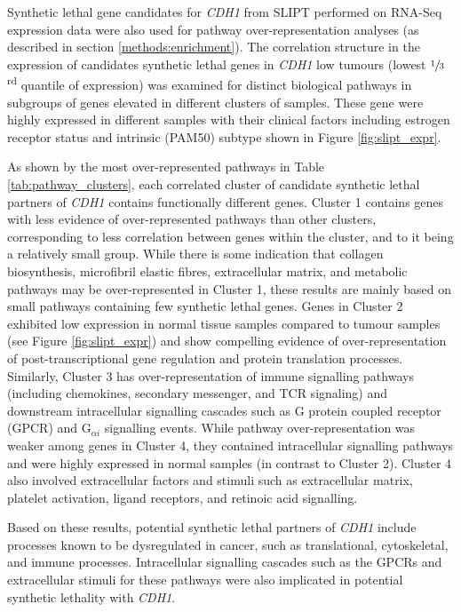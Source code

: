 Synthetic lethal gene candidates for \textit{CDH1} from SLIPT performed on RNA-Seq expression data were also used for pathway over-representation analyses (as described in section \ref{methods:enrichment}). The correlation structure in the expression of candidates synthetic lethal genes in \textit{CDH1} low tumours (lowest $\sfrac{1}{3}$\textsuperscript{rd} quantile of expression) was examined for distinct biological pathways in subgroups of genes elevated in different clusters of samples. These gene were highly expressed in different samples with their clinical factors including estrogen receptor status and intrinsic (PAM50) subtype \citep{Parker2009} shown in Figure \ref{fig:slipt_expr}.

As shown by the most over-represented pathways in Table \ref{tab:pathway_clusters}, each correlated cluster of candidate synthetic lethal partners of \textit{CDH1} contains functionally different genes. %
Cluster 1 contains genes with less evidence of over-represented pathways than other clusters, corresponding to less correlation between genes within the cluster, and to it being a relatively small group. While there is some indication that collagen biosynthesis, microfibril elastic fibres, extracellular matrix, and metabolic pathways may be over-represent\-ed in Cluster 1, these results are mainly based on small pathways containing few synthetic lethal genes. Genes in Cluster 2 exhibited low expression in normal tissue samples compared to tumour samples (see Figure \ref{fig:slipt_expr}) and show compelling evidence of over-represent\-ation of post-transcriptional gene regulation and protein translation processes. Similarly, Cluster 3 has over-represent\-ation of immune signalling pathways (including chemokines, secondary messenger, and TCR signaling) and downstream intracellular signalling cascades such as G protein coupled receptor (GPCR) and  G$_{\alpha i}$ signalling events. While pathway over-represent\-ation was weaker among genes in Cluster 4, they contained intracellular signalling pathways and were highly expressed in normal samples (in contrast to Cluster 2). Cluster 4 also involved extracellular factors and stimuli such as extracellular matrix, platelet activation, ligand receptors, and retinoic acid signalling.

Based on these results, potential synthetic lethal partners of \textit{CDH1} include processes known to be dysregulated in cancer, such as translational, cytoskeletal, and immune processes. Intracellular signalling cascades such as the GPCRs and extracellular stimuli for these pathways were also implicated in potential synthetic lethality with \textit{CDH1}.


